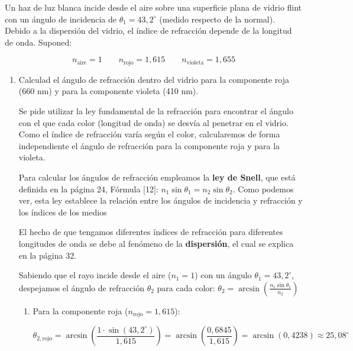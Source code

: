 \documentclass[11pt, a4paper]{article}
\newenvironment{problem}[1][Cuestión]{
	\vspace{0.5cm}
	\noindent{\Large\bfseries #1} \par\vspace{0.5cm}
}{
	\vspace{0.5cm}
}
\begin{document}
	\begin{problem}[Cuestión 2]
		Un haz de luz blanca incide desde el aire sobre una superficie plana de vidrio flint con un ángulo de incidencia de $\theta_1 = 43,2^\circ$ (medido respecto de la normal). Debido a la dispersión del vidrio, el índice de refracción depende de la longitud de onda. Suponed:

		\begin{equation}
			n_{\text{aire}} = 1 \qquad n_{\text{rojo}}=1,615 \qquad n_{\text{violeta}} = 1,655
		\end{equation}

		\begin{enumerate}[label=\alph*)]
			\item Calculad el ángulo de refracción dentro del vidrio para la componente roja (660 nm) y para la componente violeta (410 nm).

				{ \color{blue} 
					Se pide utilizar la ley fundamental de la refracción para encontrar el ángulo con el que cada color (longitud de onda) se desvía al penetrar en el vidrio. Como el índice de refracción varía según el color, calcularemos de forma independiente el ángulo de refracción para la componente roja y para la violeta.

					Para calcular los ángulos de refracción empleamos la \textbf{ley de Snell}, que está definida en la página 24, Fórmula [12]: $n_1 \sin \theta_1 = n_2 \sin \theta_2$. Como podemos ver, esta ley establece la relación entre los ángulos de incidencia y refracción y los índices de los medios 

					El hecho de que tengamos diferentes índices de refracción para diferentes longitudes de onda se debe al fenómeno de la \textbf{dispersión}, el cual se explica en la página 32.

					Sabiendo que el rayo incide desde el aire ($n_1 = 1$) con un ángulo $\theta_1 = 43,2^\circ$, despejamos el ángulo de refracción $\theta_2$ para cada color:
					$\theta_2 = \arcsin \left( \frac{n_1 \sin \theta_1}{n_2} \right)$

					\begin{enumerate}
						\item Para la componente roja ($n_{\text{rojo}} = 1,615$):          

						$$
						\theta_{2,\text{rojo}} = \arcsin \left( \frac{1 \cdot \sin(43,2^\circ)}{1,615} \right) = \arcsin \left( \frac{0,6845}{1,615} \right) = \arcsin (0,4238) \approx 25,08^\circ
						$$

						\vspace{0.5cm}


\end{enumerate}}
\end{enumerate}
\end{problem}
\end{document}
